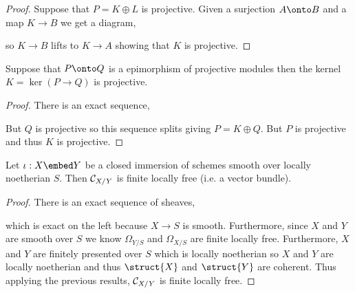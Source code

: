 \documentclass[12pt]{article}
\begin{document}
\begin{proof}
Suppose that $P = K \oplus L$ is projective. Given a surjection $A \onto B$ and a map $K \to B$ we get a diagram,
\begin{center}
\end{center}
so $K \to B$ lifts to $K \to A$ showing that $K$ is projective.
\end{proof}

\begin{cor}
Suppose that $P \onto Q$ is a epimorphism of projective modules then the kernel $K = \ker{(P \to Q)}$ is projective.
\end{cor}

\begin{proof}
There is an exact sequence,
\begin{center}
\end{center}
But $Q$ is projective so this sequence splits giving $P = K \oplus Q$. But $P$ is projective and thus $K$ is projective.
\end{proof}

\begin{prop}
Let $\iota : X \embed Y$ be a closed immersion of schemes smooth over locally noetherian $S$. Then $\mathcal{C}_{X/Y}$ is finite locally free (i.e. a vector bundle).
\end{prop}

\begin{proof}
There is an exact sequence of sheaves,
\begin{center}
\end{center}
which is exact on the left because $X \to S$ is smooth. Furthermore, since $X$ and $Y$ are smooth over $S$ we know $\Omega_{Y/S}$ and $\Omega_{X/S}$ are finite locally free. Furthermore, $X$ and $Y$ are finitely presented over $S$ which is locally noetherian so $X$ and $Y$ are locally noetherian and thus $\struct{X}$ and $\struct{Y}$ are coherent. Thus applying the previous results, $\mathcal{C}_{X/Y}$ is finite locally free.
\end{proof}
\end{document}
